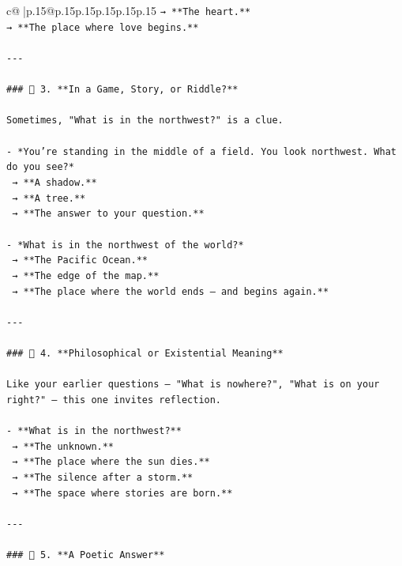 \documentclass{article}
\begin{document}
{\begin{supertabular}{c@{$\;$}|p{.15\linewidth}@{}p{.15\linewidth}p{.15\linewidth}p{.15\linewidth}p{.15\linewidth}p{.15\linewidth}}
{{{\texttt{→ **The heart.**  } \\
\texttt{→ **The place where love begins.**} \\
\\ 
\texttt{{-}{-}{-}} \\
\\ 
\texttt{\#\#\# 🔹 3. **In a Game, Story, or Riddle?**} \\
\\ 
\texttt{Sometimes, "What is in the northwest?" is a clue.} \\
\\ 
\texttt{{-} *You’re standing in the middle of a field. You look northwest. What do you see?*  } \\
\texttt{  → **A shadow.**  } \\
\texttt{  → **A tree.**  } \\
\texttt{  → **The answer to your question.**} \\
\\ 
\texttt{{-} *What is in the northwest of the world?*  } \\
\texttt{  → **The Pacific Ocean.**  } \\
\texttt{  → **The edge of the map.**  } \\
\texttt{  → **The place where the world ends — and begins again.**} \\
\\ 
\texttt{{-}{-}{-}} \\
\\ 
\texttt{\#\#\# 🔹 4. **Philosophical or Existential Meaning**} \\
\\ 
\texttt{Like your earlier questions — "What is nowhere?", "What is on your right?" — this one invites reflection.} \\
\\ 
\texttt{{-} **What is in the northwest?**  } \\
\texttt{  → **The unknown.**  } \\
\texttt{  → **The place where the sun dies.**  } \\
\texttt{  → **The silence after a storm.**  } \\
\texttt{  → **The space where stories are born.**} \\
\\ 
\texttt{{-}{-}{-}} \\
\\ 
\texttt{\#\#\# 🔹 5. **A Poetic Answer**} \\
\\ 
}}}
\end{supertabular}}
\end{document}
